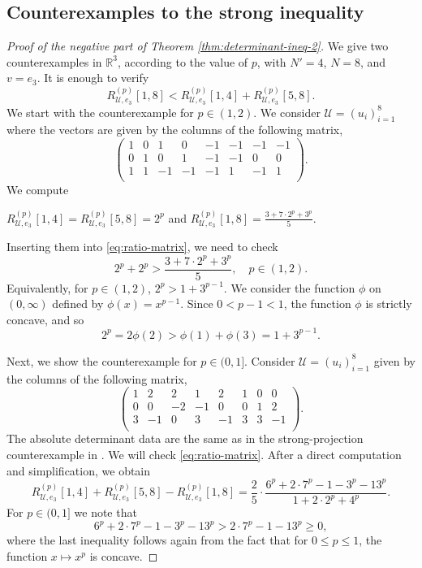 \documentclass[11pt,a4paper]{amsart}
\theoremstyle{plain}
\theoremstyle{definition}
\newcommand{\R}{\mathbb R}
\begin{document}
\subsection{Counterexamples to the strong inequality}
\DetIneq*
\begin{proof}[Proof of the negative part of Theorem \ref{thm:determinant-ineq-2}]
We give two counterexamples in $\R^3$, according to the value of $p$, with
$N'=4$, $N=8$, and $v=e_3$.  It is enough to verify
\begin{equation}    \label{eq:ratio-matrix}
R_{\mathcal{U},e_3}^{(p)}[1,8]
<
R_{\mathcal{U},e_3}^{(p)}[1,4]
+
R_{\mathcal{U},e_3}^{(p)}[5,8]
.
\end{equation}
We start with the counterexample for $p \in (1,2)$. We consider $\mathcal{U}=(u_i)_{i=1}^8$ where the vectors are given by the columns of the following matrix, 
\[
    \begin{pmatrix}
        1&0&1&0     &-1&-1&-1&-1\\
        0&1&0&1     &-1&-1&0&0\\
        1&1&-1&-1   &-1&1&-1&1\\
    \end{pmatrix}.
\]
We compute 
\begin{center}
    $R_{\mathcal{U},e_3}^{(p)}[1,4] =R_{\mathcal{U},e_3}^{(p)}[5,8] =2^p $ and $R_{\mathcal{U},e_3}^{(p)}[1,8]  = \frac{3+7\cdot 2^p +3^p}{5}$. 
\end{center}
Inserting them into \eqref{eq:ratio-matrix}, we need to check
\[
    2^p +2^p > \frac{3+7\cdot 2^p +3^p}{5}, \quad p \in (1,2).
\]
Equivalently, for $p \in (1,2)$, $2^p > 1 + 3^{p-1}.$ We consider the function $\phi $ on $(0,\infty)$ defined by $ \phi(x) = x^{p-1}$. Since $0<p-1<1$, the function $\phi $ is strictly concave, and so 
\[
    2^p = 2\phi(2) > \phi(1) + \phi(3) = 1 + 3^{p-1}.
\]

Next, we show the counterexample for $ p \in (0,1]$.  Consider $\mathcal{U}=(u_i)_{i=1}^8$ given by the columns of the following matrix, 
\[
    \begin{pmatrix}
        1&2&2&1&2&1&0&0\\
        0&0&-2&-1&0&0&1&2\\
        3&-1&0&3&-1&3&3&-1\\
    \end{pmatrix}.
\]
The absolute determinant data are the same as in the strong-projection counterexample in \cite{FHMNWZ-26-I}.
We will check \eqref{eq:ratio-matrix}. After a direct computation and simplification, we obtain
\begin{equation}
    R_{\mathcal{U},e_3}^{(p)}[1,4] +
    R_{\mathcal{U},e_3}^{(p)}[5,8] -R_{\mathcal{U},e_3}^{(p)}[1,8]
    = \frac{2}{5} \cdot \frac{ 6^p+2\cdot7^p-1-3^p-13^p }{ 1+2\cdot2^p+4^p }.
\end{equation}
For $p\in (0,1]$ we note that 
$$
 6^p+2\cdot 7^p-1 -3^p-13^p >  2\cdot 7^p-1 -13^p \ge 0, 
$$
where the last inequality follows again from the fact that for $0\leq p \leq 1$, the function $x \mapsto x^{p}$ is concave. 


\end{proof}
\end{document}
